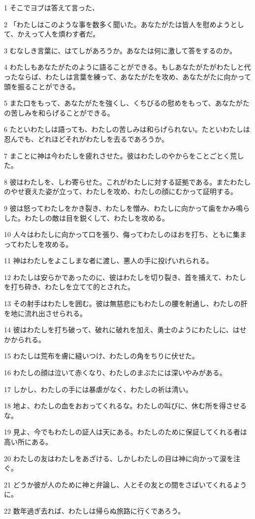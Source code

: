 \par 1 そこでヨブは答えて言った、
\par 2 「わたしはこのような事を数多く聞いた。あなたがたは皆人を慰めようとして、かえって人を煩わす者だ。
\par 3 むなしき言葉に、はてしがあろうか。あなたは何に激して答をするのか。
\par 4 わたしもあなたがたのように語ることができる。もしあなたがたがわたしと代ったならば、わたしは言葉を練って、あなたがたを攻め、あなたがたに向かって頭を振ることができる。
\par 5 また口をもって、あなたがたを強くし、くちびるの慰めをもって、あなたがたの苦しみを和らげることができる。
\par 6 たといわたしは語っても、わたしの苦しみは和らげられない。たといわたしは忍んでも、どれほどそれがわたしを去るであろうか。
\par 7 まことに神は今わたしを疲れさせた。彼はわたしのやからをことごとく荒した。
\par 8 彼はわたしを、しわ寄らせた。これがわたしに対する証拠である。またわたしのやせ衰えた姿が立って、わたしを攻め、わたしの顔にむかって証明する。
\par 9 彼は怒ってわたしをかき裂き、わたしを憎み、わたしに向かって歯をかみ鳴らした。わたしの敵は目を鋭くして、わたしを攻める。
\par 10 人々はわたしに向かって口を張り、侮ってわたしのほおを打ち、ともに集まってわたしを攻める。
\par 11 神はわたしをよこしまな者に渡し、悪人の手に投げいれられる。
\par 12 わたしは安らかであったのに、彼はわたしを切り裂き、首を捕えて、わたしを打ち砕き、わたしを立てて的とされた。
\par 13 その射手はわたしを囲む。彼は無慈悲にもわたしの腰を射通し、わたしの肝を地に流れ出させられる。
\par 14 彼はわたしを打ち破って、破れに破れを加え、勇士のようにわたしに、はせかかられる。
\par 15 わたしは荒布を膚に縫いつけ、わたしの角をちりに伏せた。
\par 16 わたしの顔は泣いて赤くなり、わたしのまぶたには深いやみがある。
\par 17 しかし、わたしの手には暴虐がなく、わたしの祈は清い。
\par 18 地よ、わたしの血をおおってくれるな。わたしの叫びに、休む所を得させるな。
\par 19 見よ、今でもわたしの証人は天にある。わたしのために保証してくれる者は高い所にある。
\par 20 わたしの友はわたしをあざける、しかしわたしの目は神に向かって涙を注ぐ。
\par 21 どうか彼が人のために神と弁論し、人とその友との間をさばいてくれるように。
\par 22 数年過ぎ去れば、わたしは帰らぬ旅路に行くであろう。

